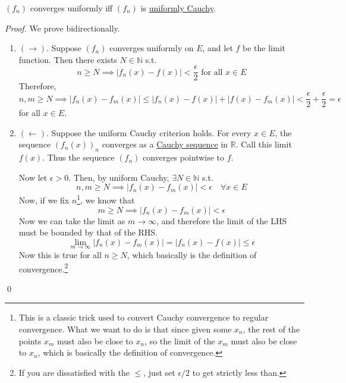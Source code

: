   \begin{lemma}
    \label{thm:cauchy-criterion-of-uniform-convergence}
    $(f_n)$ converges uniformly iff $(f_n)$ is \hyperref[def:uniformly-cauchy]{uniformly Cauchy}. 
  \end{lemma}
  \begin{proof}
    We prove bidirectionally. 
    \begin{enumerate}
      \item $(\rightarrow)$. Suppose $(f_n)$ converges uniformly on $E$, and let $f$ be the limit function. Then there exists $N \in \mathbb{N}$ s.t. 
      \begin{equation}
        n \geq N \implies |f_n (x) - f(x)| < \frac{\epsilon}{2} \text{ for all } x \in E
      \end{equation} 
      Therefore, 
      \begin{equation}
        n, m \geq N \implies |f_n (x) - f_m (x)| \leq |f_n (x) - f(x)| + |f(x) - f_m (x)| < \frac{\epsilon}{2} + \frac{\epsilon}{2} = \epsilon 
      \end{equation}
      for all $x \in E$. 

      \item $(\leftarrow)$. Suppose the uniform Cauchy criterion holds. For every $x \in E$, the sequence $(f_n (x))_n$ converges as a \hyperref[def:cauchy-sequence]{Cauchy sequence} in $\mathbb{R}$. Call this limit $f(x)$. Thus the sequence $(f_n)$ converges pointwise to $f$. 

      Now let $\epsilon > 0$. Then, by uniform Cauchy, $\exists N \in \mathbb{N}$ s.t. 
      \begin{equation}
        n, m \geq N \implies |f_n (x) - f_m (x)| < \epsilon \quad \forall x \in E
      \end{equation}
      Now, if we fix $n$\footnote{This is a classic trick used to convert Cauchy convergence to regular convergence. What we want to do is that since given some $x_n$, the rest of the points $x_m$ must also be close to $x_n$, so the limit of the $x_m$ must also be close to $x_n$, which is basically the definition of convergence.}, we know that 
      \begin{equation}
        m \geq N \implies |f_n (x) - f_m (x)| < \epsilon 
      \end{equation}
      Now we can take the limit as $m \to \infty$, and therefore the limit of the LHS must be bounded by that of the RHS. 
      \begin{equation}
        \lim_{m \to \infty} |f_n (x) - f_m (x)| = |f_n (x) - f(x)| \leq \epsilon
      \end{equation}
      Now this is true for all $n \geq N$, which basically is the definition of convergence.\footnote{If you are dissatisfied with the $\leq$, just set $\epsilon/2$ to get strictly less than. }
    \end{enumerate}
    \qed 


\end{proof}
